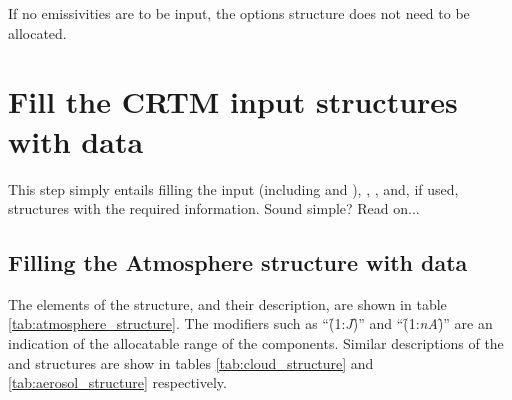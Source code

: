 If no emissivities are to be input, the options structure does not need to be allocated.



\section{Fill the CRTM input structures with data}
\label{sec:fill_step}

This step simply entails filling the input \hyperref[sec:atmosphere_structure]{\Atmosphere} (including \hyperref[sec:cloud_structure]{\Cloud} and \hyperref[sec:aerosol_structure]{\Aerosol}), \hyperref[sec:surface_structure]{\Surface}, \hyperref[sec:geometry_structure]{\Geometry}, and, if used,  \hyperref[sec:options_structure]{\Options} structures with the required information. Sound simple? Read on...


\subsection{Filling the Atmosphere structure with data}

The elements of the \hyperref[sec:atmosphere_structure]{\Atmosphere} structure, and their description, are shown in table \ref{tab:atmosphere_structure}. The modifiers such as ``\f{(}1:\textit{J}\f{)}'' and ``\f{(}1:\textit{nA}\f{)}'' are an indication of the allocatable range of the components. Similar descriptions of the \hyperref[sec:cloud_structure]{\Cloud} and \hyperref[sec:aerosol_structure]{\Aerosol} structures are show in tables \ref{tab:cloud_structure} and \ref{tab:aerosol_structure} respectively.


